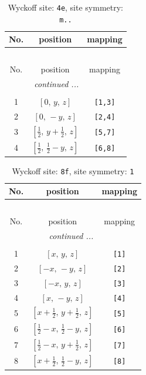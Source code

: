 \documentclass[fleqn,8pt]{jsarticle}
\begin{document}
\renewcommand{\arraystretch}{1.2}
\begin{longtable}{ccc}
\caption{Wyckoff site: {\tt 4e}, site symmetry: {\tt m..}}
 \\
 \hline \hline
No. & position & mapping \\ \hline \endfirsthead

\multicolumn{2}{l}{\tablename\ \thetable{}} \\
 \hline \hline
No. & position & mapping \\ \hline \endhead

 \hline \hline
\multicolumn{2}{r}{\footnotesize\it continued ...} \\ \endfoot

 \hline \hline
\multicolumn{2}{r}{} \\ \endlastfoot

1 & $\left[ 0,\, y,\, z \right]$ & {\tt [1,3]} \\ \hline
2 & $\left[ 0,\, - y,\, z \right]$ & {\tt [2,4]} \\ \hline
3 & $\left[ \frac{1}{2},\, y + \frac{1}{2},\, z \right]$ & {\tt [5,7]} \\ \hline
4 & $\left[ \frac{1}{2},\, \frac{1}{2} - y,\, z \right]$ & {\tt [6,8]} \\
\end{longtable}
\renewcommand{\arraystretch}{1.2}
\begin{longtable}{ccc}
\caption{Wyckoff site: {\tt 8f}, site symmetry: {\tt 1}}
 \\
 \hline \hline
No. & position & mapping \\ \hline \endfirsthead

\multicolumn{2}{l}{\tablename\ \thetable{}} \\
 \hline \hline
No. & position & mapping \\ \hline \endhead

 \hline \hline
\multicolumn{2}{r}{\footnotesize\it continued ...} \\ \endfoot

 \hline \hline
\multicolumn{2}{r}{} \\ \endlastfoot

1 & $\left[ x,\, y,\, z \right]$ & {\tt [1]} \\ \hline
2 & $\left[ - x,\, - y,\, z \right]$ & {\tt [2]} \\ \hline
3 & $\left[ - x,\, y,\, z \right]$ & {\tt [3]} \\ \hline
4 & $\left[ x,\, - y,\, z \right]$ & {\tt [4]} \\ \hline
5 & $\left[ x + \frac{1}{2},\, y + \frac{1}{2},\, z \right]$ & {\tt [5]} \\ \hline
6 & $\left[ \frac{1}{2} - x,\, \frac{1}{2} - y,\, z \right]$ & {\tt [6]} \\ \hline
7 & $\left[ \frac{1}{2} - x,\, y + \frac{1}{2},\, z \right]$ & {\tt [7]} \\ \hline
8 & $\left[ x + \frac{1}{2},\, \frac{1}{2} - y,\, z \right]$ & {\tt [8]} \\
\end{longtable}
\end{document}
